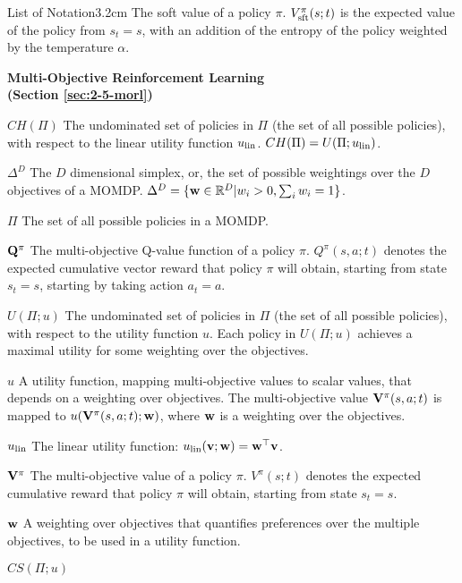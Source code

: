 \begin{mclistof}{List of Notation}{3.2cm}
        The soft value of a policy $\pi$. $V_{{\textnormal{sft}}}^{\pi}(s;t)$ is the expected value of the policy from $s_t=s$, with an addition of the entropy of the policy weighted by the temperature $\alpha$.
    \item[{\parbox[t]{\textwidth}{
        \Large\textbf{Multi-Objective Reinforcement Learning \\(Section \ref{sec:2-5-morl})}\hfill\hfill
      }}]
    \item[$CH(\Pi)$] 
        The undominated set of policies in $\Pi$ (the set of all possible policies), with respect to the linear utility function $u_{{\textnormal{lin}}}$. $CH(\Pi)=U(\Pi;u_{{\textnormal{lin}}})$.
    \item[$\Delta^D$] 
        The $D$ dimensional simplex, or, the set of possible weightings over the $D$ objectives of a MOMDP. $\Delta^D = \{\mathbf{w}\in\mathbb{R}^D|w_i > 0, \sum_i w_i = 1\}$.
    \item[$\Pi$] 
        The set of all possible policies in a MOMDP.
    \item[$\mathbf{Q}^{\pi}$]
        The multi-objective Q-value function of a policy $\pi$. $Q^{\pi}(s,a;t)$ denotes the expected cumulative vector reward that policy $\pi$ will obtain, starting from state $s_t=s$, starting by taking action $a_t=a$.
    \item[$U(\Pi;u)$] 
        The undominated set of policies in $\Pi$ (the set of all possible policies), with respect to the utility function $u$. Each policy in $U(\Pi;u)$ achieves a maximal utility for some weighting over the objectives.
    \item[$u$] 
        A utility function, mapping multi-objective values to scalar values, that depends on a weighting over objectives. The multi-objective value $\mathbf{V}^{\pi}(s,a;t)$ is mapped to $u(\mathbf{V}^{\pi}(s,a;t);\mathbf{w})$, where $\mathbf{w}$ is a weighting over the objectives.
    \item[$u_{{\textnormal{lin}}}$]
        The linear utility function: $u_{{\textnormal{lin}}}(\mathbf{v};\mathbf{w}) = \mathbf{w}^\top \mathbf{v}$.
    \item[$\mathbf{V}^{\pi}$]
        The multi-objective value of a policy $\pi$. $V^{\pi}(s;t)$ denotes the expected cumulative reward that policy $\pi$ will obtain, starting from state $s_t=s$.
    \item[$\mathbf{w}$] 
        A weighting over objectives that quantifies preferences over the multiple objectives, to be used in a utility function.
    \item[$CS(\Pi;u)$] 

\end{mclistof}
